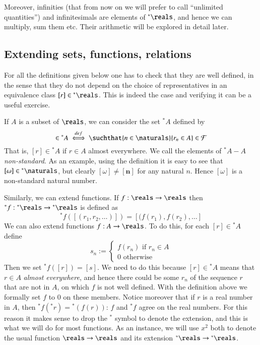 \documentclass[adraft, copyright,creativecommons,sharealike,noncommercial]{eptcs}
\newcommand{\nstar}{{^*}}
\begin{document}
Moreover, infinities (that from now on we will prefer to call ``unlimited quantities'') and infinitesimals are elements of $\nstar \reals$, and hence we can multiply, sum them etc. Their arithmetic will be explored in detail later.

\subsection{Extending sets, functions, relations}\label{sec:extending sets functions relations}
\begin{remark}
	For all the definitions given below one has to check that they are well defined, in the sense that they do not depend on the choice of representatives in an equivalence class $[r] \in \nstar\reals$. This is indeed the case and verifying it can be a useful exercise.
\end{remark}
If $A$ is a subset of $\reals$, we can consider the set $\nstar A$ defined by
\begin{equation*}
	[r] \in \nstar A \iffdef \suchthat{n \in \naturals}{r_n \in A} \in \mathcal{F}
\end{equation*}
That is, $[r] \in \nstar A$ if $r \in A$ almost everywhere. We call the elements of $\nstar A - A$ \emph{non-standard}. As an example, using the definition it is easy to see that $[\omega] \in \nstar  \naturals$, but clearly $[\omega] \neq [\mathbf{n}]$ for any natural $n$. Hence $[\omega]$ is a non-standard natural number.

Similarly, we can extend functions. If $f:\reals \to \reals$ then $\nstar f:\nstar \reals \to \nstar \reals$ is defined as
\begin{equation*}
	\nstar f([(r_1, r_2, \dots)]) = [(f(r_1), f(r_2), \dots]
\end{equation*}
We can also extend functions $f:A \to \reals$. To do this, for each $[r] \in \nstar A$ define 
\begin{equation*}
	s_n :=
	\begin{cases}
		f(r_n) \text{ if } r_n \in A\\
		0 \text{ otherwise}
	\end{cases}
\end{equation*}
Then we set $\nstar f([r]) = [s]$. We need to do this because $[r] \in \nstar A$ means that $r \in A$ \emph{almost everywhere}, and hence there could be some $r_n$ of the sequence $r$ that are not in $A$, on which $f$ is not well defined. With the definition above we formally set $f$ to $0$ on these members. Notice moreover that if $r$ is a real number in $A$, then $\nstar f({\nstar r}) = {\nstar (f(r))}$: $f$ and $\nstar f$ agree on the real numbers. For this reason it makes sense to drop the $\nstar $ symbol to denote the extension, and this is what we will do for most functions. As an instance, we will use $x^2$ both to denote the usual function $\reals \to \reals$ and its extension $\nstar \reals \to {\nstar \reals}$.
\end{document}
